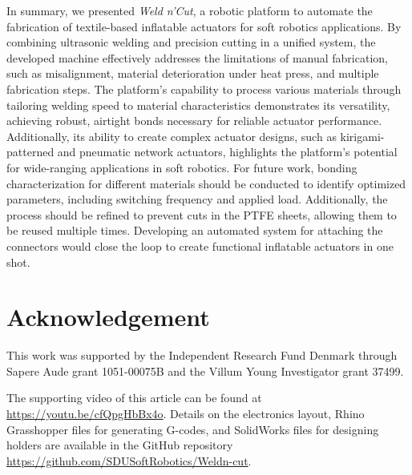 \documentclass[journal, letterpaper]{IEEEtran}
\begin{document}
In summary, we presented \textit{Weld n'Cut}, a robotic platform to automate the fabrication of textile-based inflatable actuators for soft robotics applications. By combining ultrasonic welding and precision cutting in a unified system, the developed machine effectively addresses the limitations of manual fabrication, such as misalignment, material deterioration under heat press, and multiple fabrication steps. The platform's capability to process various materials through tailoring welding speed to material characteristics demonstrates its versatility, achieving robust, airtight bonds necessary for reliable actuator performance. Additionally, its ability to create complex actuator designs, such as kirigami-patterned and pneumatic network actuators, highlights the platform’s potential for wide-ranging applications in soft robotics.
For future work, bonding characterization for different materials should be conducted to identify optimized parameters, including switching frequency and applied load. Additionally, the process should be refined to prevent cuts in the PTFE sheets, allowing them to be reused multiple times. Developing an automated system for attaching the connectors would close the loop to create functional inflatable actuators in one shot.

\section{Acknowledgement}
This work was supported by the Independent Research Fund Denmark through Sapere Aude grant 1051-00075B and the Villum Young Investigator grant 37499.

\appendix
The supporting video of this article can be found at \url{https://youtu.be/cfQpgHbBx4o}. Details on the electronics layout, Rhino Grasshopper files for generating G-codes, and SolidWorks files for designing holders are available in the GitHub repository 
\url{https://github.com/SDUSoftRobotics/Weldn-cut}.



 
\end{document}
